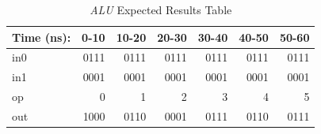 \documentclass[11pt]{article}
\begin{document}
\begin{table}[ht]\centering
	\caption{\textit{ALU} Expected Results Table}
	\label{ALU:tbl:alu_ERT}\medskip
	\begin{tabular}{l|rrrrrr}
		Time (ns): & 0-10 & 10-20 & 20-30 & 30-40 & 40-50 & 50-60 \\
		\midrule
		in0 & 0111 & 0111 & 0111 & 0111 & 0111 & 0111 \\
		in1 & 0001 & 0001 & 0001 & 0001  & 0001 & 0001 \\
		op	& 0 & 1  & 2 & 3 & 4 & 5  \\
		\midrule
		out & 1000  & 0110 & 0001 & 0111  & 0110 & 0111 \\
		\bottomrule
	\end{tabular}
\end{table}
\pagebreak
\end{document}
